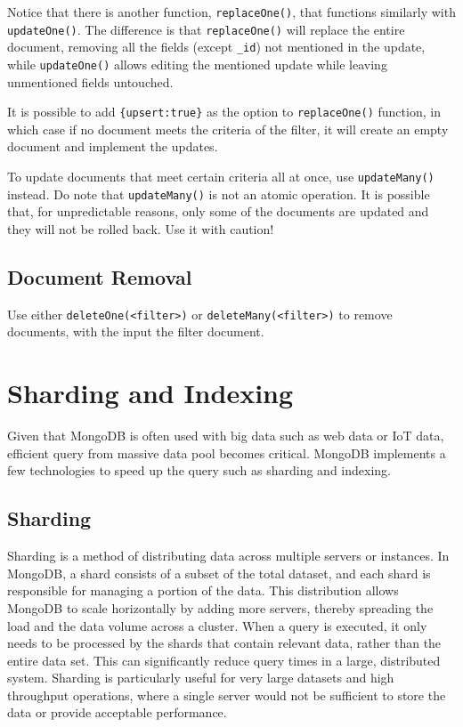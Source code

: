 Notice that there is another function, \verb|replaceOne()|, that functions similarly with \verb|updateOne()|. The difference is that \verb|replaceOne()| will replace the entire document, removing all the fields (except \verb|_id|) not mentioned in the update, while \verb|updateOne()| allows editing the mentioned update while leaving unmentioned fields untouched.

It is possible to add \verb|{upsert:true}| as the option to \verb|replaceOne()| function, in which case if no document meets the criteria of the filter, it will create an empty document and implement the updates.

To update documents that meet certain criteria all at once, use \verb|updateMany()| instead. Do note that \verb|updateMany()| is not an atomic operation. It is possible that, for unpredictable reasons, only some of the documents are updated and they will not be rolled back. Use it with caution!

\subsection{Document Removal}

Use either \verb|deleteOne(<filter>)| or \verb|deleteMany(<filter>)| to remove documents, with the input the filter document.

\section{Sharding and Indexing}

Given that MongoDB is often used with big data such as web data or IoT data, efficient query from massive data pool becomes critical. MongoDB implements a few technologies to speed up the query such as sharding and indexing.

\subsection{Sharding}

Sharding is a method of distributing data across multiple servers or instances. In MongoDB, a shard consists of a subset of the total dataset, and each shard is responsible for managing a portion of the data. This distribution allows MongoDB to scale horizontally by adding more servers, thereby spreading the load and the data volume across a cluster. When a query is executed, it only needs to be processed by the shards that contain relevant data, rather than the entire data set. This can significantly reduce query times in a large, distributed system. Sharding is particularly useful for very large datasets and high throughput operations, where a single server would not be sufficient to store the data or provide acceptable performance.

